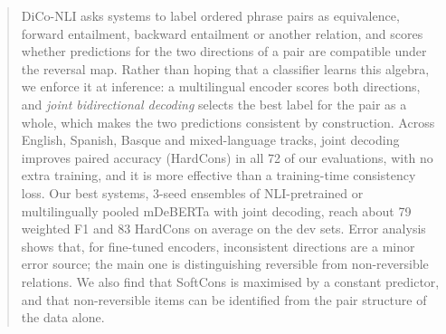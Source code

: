 \begin{abstract}
DiCo-NLI asks systems to label ordered phrase pairs as equivalence, forward entailment, backward entailment or another relation, and scores whether predictions for the two directions of a pair are compatible under the reversal map. Rather than hoping that a classifier learns this algebra, we enforce it at inference: a multilingual encoder scores both directions, and \emph{joint bidirectional decoding} selects the best label for the pair as a whole, which makes the two predictions consistent by construction. Across English, Spanish, Basque and mixed-language tracks, joint decoding improves paired accuracy (HardCons) in all 72 of our evaluations, with no extra training, and it is more effective than a training-time consistency loss. Our best systems, 3-seed ensembles of NLI-pretrained or multilingually pooled mDeBERTa with joint decoding, reach about 79 weighted F1 and 83 HardCons on average on the dev sets. Error analysis shows that, for fine-tuned encoders, inconsistent directions are a minor error source; the main one is distinguishing reversible from non-reversible relations. We also find that SoftCons is maximised by a constant predictor, and that non-reversible items can be identified from the pair structure of the data alone.
\end{abstract}

